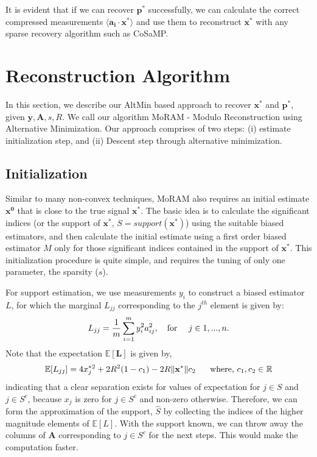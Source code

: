 It is evident that if we can recover $\mathbf{p^*}$ successfully, we can calculate the correct compressed measurements $\langle \mathbf{a_i} \cdot \mathbf{x^*} \rangle$ and use them to reconstruct $\mathbf{x^*}$ with any sparse recovery algorithm such as CoSaMP.


\section{Reconstruction Algorithm}

In this section, we describe our AltMin based approach to recover $\mathbf{x^*}$ and $\mathbf{p^*}$, given $\mathbf{y, A}, s, R$. We call our algorithm MoRAM - Modulo Reconstruction using Alternative Minimization. Our approach comprises of two steps: (i) estimate initialization step, and (ii) Descent step through alternative minimization.

\subsection{Initialization}
\label{sec:init}
Similar to many non-convex techniques, MoRAM also requires an initial estimate $\mathbf{{x}^0}$ that is close to the true signal $\mathbf{{x}^*}$. The basic idea is to calculate the significant indices (or the support of $\mathbf{{x}^*}$, $S=support(\mathbf{{x}^*})$) using the suitable biased estimators, and then calculate the initial estimate using a first order biased estimator $M$ only for those significant indices contained in the support of $\mathbf{{x}^*}$. This initialization procedure is quite simple, and requires the tuning of only one parameter, the sparsity ($s$).

For support estimation, we use measurements $y_{i}$ to construct a biased estimator $L$, for which the marginal $L_{jj}$ corresponding to the $j^{th}$ element is given by:
$$
L_{jj} = \frac{1}{m}\sum_{i=1}^{m}y_{i}^2 a_{ij}^2,~~~\textnormal{for}~~~~j \in {1,...,n}.
$$
Note that the expectation $\mathbb{E}[\mathbf{L}]$ is given by,
$$
\mathbb{E}[L_{jj}] = 4x_{j}^{*2}+2R^2(1-c_1)-2R\|\mathbf{{x}^*}\|c_2~~~~~\textnormal{where,}~c_1,c_2 \in \mathbb{R}
$$
indicating that a clear separation exists for values of expectation for $j \in S$ and $j \in S^c$, because $x_j$ is zero for $j \in S^c$ and non-zero otherwise. Therefore, we can form the approximation of the support, $\widehat{S}$ by collecting the indices of the higher magnitude elements of $\mathbb{E}[L]$. With the support known, we can throw away the columns of $\mathbf{A}$ corresponding to $j \in S^c$ for the next steps. This would make the computation faster.

